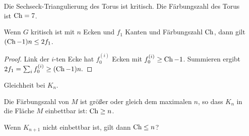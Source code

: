 \begin{ex}
    Die Sechseck-Triangulierung des Torus ist kritisch.
    Die Färbungszahl des Torus ist $\operatorname { Ch } = 7$.
\end{ex}

\begin{kor}
    Wenn $G$ kritisch ist mit $n$ Ecken und $f_1$ Kanten und Färbungszahl $\operatorname { Ch }$, dann gilt $(\operatorname { Ch } - 1)n \le 2 f_1$.
    \begin{proof}
        Link  der $i$-ten Ecke hat $f_0^{(i)}$ Ecken mit $f_0^{(i)} \ge \operatorname { Ch } - 1$.
        Summieren ergibt
        \begin{math}
            2 f_1
            = \sum_{i} f_0^{(i)}
            \ge (\operatorname { Ch } - 1) n.
        \end{math}
    \end{proof}
    \begin{note}
        Gleichheit bei $K_n$.
    \end{note}
\end{kor}

\begin{nt}
    Die Färbungszahl von $M$ ist größer oder gleich dem maximalen $n$, so dass $K_n$ in die Fläche $M$ einbettbar ist: $\operatorname { Ch } \ge n$.

    Wenn $K_{n+1}$ nicht einbettbar ist, gilt dann $\operatorname { Ch } \le n$?
\end{nt}

